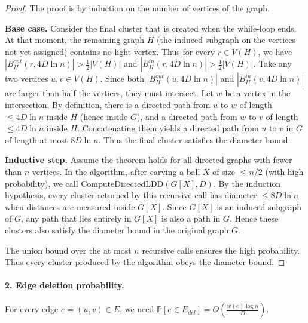 \begin{proof}
    The proof is by induction on the number of vertices of the graph.
    
    \textbf{Base case.} Consider the final cluster that is created when the while‑loop ends. At that moment, the remaining graph $H$ (the induced subgraph on the vertices not yet assigned) contains no light vertex. Thus for every $r \in V(H)$, we have $|B^{out}_H(r, 4D\ln n)| > \frac12 |V(H)|$ and $|B^{in}_H(r, 4D\ln n)| > \frac12 |V(H)|$. Take any two vertices $u,v \in V(H)$. Since both $|B^{out}_H(u, 4D\ln n)|$ and $|B^{in}_H(v, 4D\ln n)|$ are larger than half the vertices, they must intersect. Let $w$ be a vertex in the intersection. By definition, there is a directed path from $u$ to $w$ of length $\le 4D\ln n$ inside $H$ (hence inside $G$), and a directed path from $w$ to $v$ of length $\le 4D\ln n$ inside $H$. Concatenating them yields a directed path from $u$ to $v$ in $G$ of length at most $8D\ln n$. Thus the final cluster satisfies the diameter bound.
    
    \textbf{Inductive step.} Assume the theorem holds for all directed graphs with fewer than $n$ vertices. In the algorithm, after carving a ball $X$ of size $\le n/2$ (with high probability), we call $\text{ComputeDirectedLDD}(G[X], D)$. By the induction hypothesis, every cluster returned by this recursive call has diameter $\le 8D\ln n$ when distances are measured inside $G[X]$. Since $G[X]$ is an induced subgraph of $G$, any path that lies entirely in $G[X]$ is also a path in $G$. Hence these clusters also satisfy the diameter bound in the original graph $G$.
    
    The union bound over the at most $n$ recursive calls ensures the high probability. Thus every cluster produced by the algorithm obeys the diameter bound.
\end{proof}

\paragraph{2. Edge deletion probability.}
For every edge $e = (u,v) \in E$, we need $\mathbb{P}[e \in E_{del}] = O\!\left(\frac{w(e) \log n}{D}\right)$.

